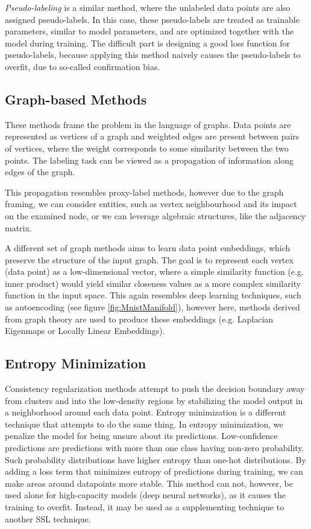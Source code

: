\emph{Pseudo-labeling} is a similar method, where the unlabeled data points are also assigned pseudo-labels. In this case, these pseudo-labels are treated as trainable parameters, similar to model parameters, and are optimized together with the model during training. The difficult part is designing a good loss function for pseudo-labels, because applying this method naively causes the pseudo-labels to overfit, due to so-called confirmation bias.


\subsection{Graph-based Methods}

These methods frame the problem in the language of graphs. Data points are represented as vertices of a graph and weighted edges are present between pairs of vertices, where the weight corresponds to some similarity between the two points. The labeling task can be viewed as a propagation of information along edges of the graph.

This propagation resembles proxy-label methods, however due to the graph framing, we can consider entities, such as vertex neighbourhood and its impact on the examined node, or we can leverage algebraic structures, like the adjacency matrix.

A different set of graph methods aims to learn data point embeddings, which preserve the structure of the input graph. The goal is to represent each vertex (data point) as a low-dimensional vector, where a simple similarity function (e.g. inner product) would yield similar closeness values as a more complex similarity function in the input space. This again resembles deep learning techniques, such as autoencoding (see figure \ref{fig:MnistManifold}), however here, methods derived from graph theory are used to produce these embeddings (e.g. Laplacian Eigenmaps or Locally Linear Embeddings).


\subsection{Entropy Minimization}

Consistency regularization methods attempt to push the decision boundary away from clusters and into the low-density regions by stabilizing the model output in a neighborhood around each data point. Entropy minimization is a different technique that attempts to do the same thing. In entropy minimization, we penalize the model for being unsure about its predictions. Low-confidence predictions are predictions with more than one class having non-zero probability. Such probability distributions have higher entropy than one-hot distributions. By adding a loss term that minimizes entropy of predictions during training, we can make areas around datapoints more stable. This method can not, however, be used alone for high-capacity models (deep neural networks), as it causes the training to overfit. Instead, it may be used as a supplementing technique to another SSL technique.


